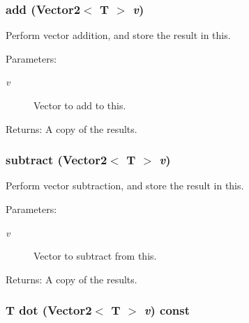 \subsubsection{ add ({\bf Vector2}$<$ T $>$ {\em v})\hspace{0.3cm}{\tt  [inline]}}\label{classEngine_1_1Vector2_87fa7013fa5077693207e68b9bf0c5c0}


Perform vector addition, and store the result in this. \begin{Desc}
\item[Parameters:]
\begin{description}
\item[{\em v}]Vector to add to this. \end{description}
\end{Desc}
\begin{Desc}
\item[Returns:]A copy of the results. \end{Desc}
\subsubsection{ subtract ({\bf Vector2}$<$ T $>$ {\em v})\hspace{0.3cm}{\tt  [inline]}}\label{classEngine_1_1Vector2_de7d5badb6f92042b54863daaa1dfa6f}


Perform vector subtraction, and store the result in this. \begin{Desc}
\item[Parameters:]
\begin{description}
\item[{\em v}]Vector to subtract from this. \end{description}
\end{Desc}
\begin{Desc}
\item[Returns:]A copy of the results. \end{Desc}
\subsubsection{\setlength{\rightskip}{0pt plus 5cm}T dot ({\bf Vector2}$<$ T $>$ {\em v}) const\hspace{0.3cm}{\tt  [inline]}}\label{classEngine_1_1Vector2_d86c89a017d018e90441e07df93a3f7b}


